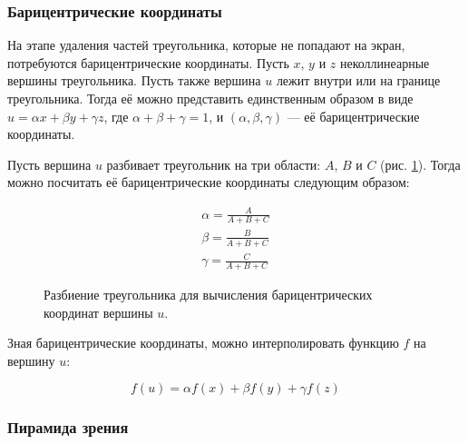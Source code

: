 \documentclass{article}
\begin{document}
\subsubsection{Барицентрические координаты}

На этапе удаления частей треугольника, которые не попадают на экран, потребуются барицентрические координаты.
Пусть $x$, $y$ и $z$ неколлинеарные вершины треугольника.
Пусть также вершина $u$ лежит внутри или на границе треугольника.
Тогда её можно представить единственным образом в виде $u = \alpha x + \beta y + \gamma z$, где $\alpha + \beta + \gamma = 1$, и $(\alpha, \beta, \gamma)$ --- её барицентрические координаты.

Пусть вершина $u$ разбивает треугольник на три области: $A$, $B$ и $C$ (рис. \ref{barycent}).
Тогда можно посчитать её барицентрические координаты следующим образом:

\begin{gather*}
	\alpha = \frac{A}{A + B + C} \\
	\beta = \frac{B}{A + B + C} \\
	\gamma = \frac{C}{A + B + C}
\end{gather*}

\begin{figure}[ht]
    \caption{Разбиение треугольника для вычисления барицентрических координат вершины $u$.}
    \label{barycent}
\end{figure}

Зная барицентрические координаты, можно интерполировать функцию $f$ на вершину $u$:

\begin{equation*}
	f(u) = \alpha f(x) + \beta f(y) + \gamma f(z)
\end{equation*}

\subsubsection{Пирамида зрения} \label{view frustum section}
\end{document}
